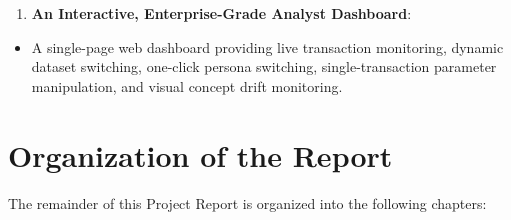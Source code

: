 \documentclass[12pt,a4paper,oneside]{report}
\begin{document}
\begin{enumerate}[leftmargin=0.35in]
\item \textbf{An Interactive, Enterprise-Grade Analyst Dashboard}:
\end{enumerate}
\begin{itemize}[leftmargin=0.35in]
\item A single-page web dashboard providing live transaction monitoring, dynamic dataset switching, one-click persona switching, single-transaction parameter manipulation, and visual concept drift monitoring.
\end{itemize}


\section{Organization of the Report}

The remainder of this Project Report is organized into the following chapters:
\end{document}
